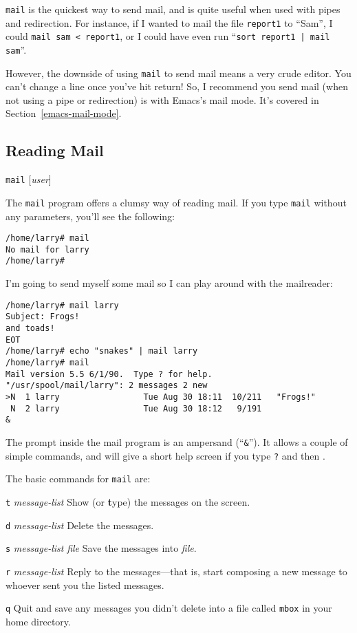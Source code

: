 {\tt mail} is the quickest way to send mail, and is quite useful when
used with pipes and redirection. For instance, if I wanted to mail
the file {\tt report1} to ``Sam'', I could {\tt mail sam < report1},
or I could have even run ``{\tt sort report1 | mail sam}''.

However, the downside of using {\tt mail} to send mail means a very
crude editor. You can't change a line once you've hit return! So, I
recommend you send mail (when not using a pipe or redirection) is with
Emacs's mail mode.  It's covered in
Section~\ref{emacs-mail-mode}.

\subsection{Reading Mail}

\begin{command}
  {\tt mail} [{\sl user}]
\end{command}

The {\tt mail} program offers a clumsy way of reading mail. If you
type {\tt mail} without any parameters, you'll see the following:

\begin{screen}\begin{verbatim}
/home/larry# mail
No mail for larry
/home/larry#
\end{verbatim}\end{screen}

I'm going to send myself some mail so I can play around with the
mailreader:

\begin{screen}\begin{verbatim}
/home/larry# mail larry
Subject: Frogs!
and toads!
EOT
/home/larry# echo "snakes" | mail larry
/home/larry# mail
Mail version 5.5 6/1/90.  Type ? for help.
"/usr/spool/mail/larry": 2 messages 2 new
>N  1 larry                 Tue Aug 30 18:11  10/211   "Frogs!"
 N  2 larry                 Tue Aug 30 18:12   9/191  
& 
\end{verbatim}\end{screen}

The prompt inside the mail program is an ampersand (``{\tt \&}''). It
allows a couple of simple commands, and will give a short help screen
if you type {\tt ?} and then \ret.

The basic commands for {\tt mail} are:

\begin{dispitems}
\item [{\tt t} {\sl message-list}] Show (or {\bf t}ype) the messages
  on the screen.
\item [{\tt d} {\sl message-list}] Delete the messages.
\item [{\tt s} {\sl message-list} {\sl file}] Save the messages into
  {\sl file}.
\item [{\tt r} {\sl message-list}] Reply to the messages---that is,
  start composing a new message to whoever sent you the listed
  messages.
\item [{\tt q}] Quit and save any messages you didn't delete into a
  file called {\tt mbox} in your home directory.
\end{dispitems}

